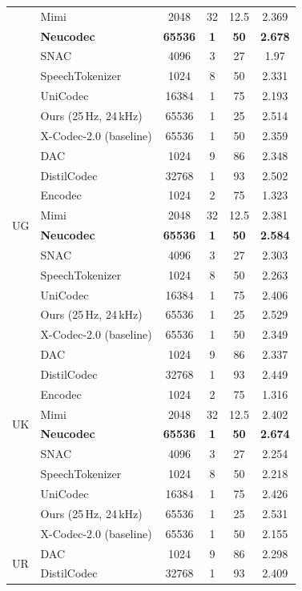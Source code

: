\documentclass[preprint]{article}
\begin{document}
\begin{longtable}{llcccc}
  & Mimi & 2048 & 32 & 12.5 & 2.369 \\
  & \textbf{Neucodec} & \textbf{65536} & \textbf{1} & \textbf{50} & \textbf{2.678} \\
  & SNAC & 4096 & 3 & 27 & 1.97 \\
  & SpeechTokenizer & 1024 & 8 & 50 & 2.331 \\
  & UniCodec & 16384 & 1 & 75 & 2.193 \\
  & Ours (25\,Hz, 24\,kHz) & 65536 & 1 & 25 & 2.514 \\
  & X-Codec-2.0 (baseline) & 65536 & 1 & 50 & 2.359 \\
\midrule
\multirow{8}{*}{UG}
  & DAC & 1024 & 9 & 86 & 2.348 \\
  & DistilCodec & 32768 & 1 & 93 & 2.502 \\
  & Encodec & 1024 & 2 & 75 & 1.323 \\
  & Mimi & 2048 & 32 & 12.5 & 2.381 \\
  & \textbf{Neucodec} & \textbf{65536} & \textbf{1} & \textbf{50} & \textbf{2.584} \\
  & SNAC & 4096 & 3 & 27 & 2.303 \\
  & SpeechTokenizer & 1024 & 8 & 50 & 2.263 \\
  & UniCodec & 16384 & 1 & 75 & 2.406 \\
  & Ours (25\,Hz, 24\,kHz) & 65536 & 1 & 25 & 2.529 \\
  & X-Codec-2.0 (baseline) & 65536 & 1 & 50 & 2.349 \\
\midrule
\multirow{8}{*}{UK}
  & DAC & 1024 & 9 & 86 & 2.337 \\
  & DistilCodec & 32768 & 1 & 93 & 2.449 \\
  & Encodec & 1024 & 2 & 75 & 1.316 \\
  & Mimi & 2048 & 32 & 12.5 & 2.402 \\
  & \textbf{Neucodec} & \textbf{65536} & \textbf{1} & \textbf{50} & \textbf{2.674} \\
  & SNAC & 4096 & 3 & 27 & 2.254 \\
  & SpeechTokenizer & 1024 & 8 & 50 & 2.218 \\
  & UniCodec & 16384 & 1 & 75 & 2.426 \\
  & Ours (25\,Hz, 24\,kHz) & 65536 & 1 & 25 & 2.531 \\
  & X-Codec-2.0 (baseline) & 65536 & 1 & 50 & 2.155 \\
\midrule
\multirow{8}{*}{UR}
  & DAC & 1024 & 9 & 86 & 2.298 \\
  & DistilCodec & 32768 & 1 & 93 & 2.409 \\

\end{longtable}
\end{document}
